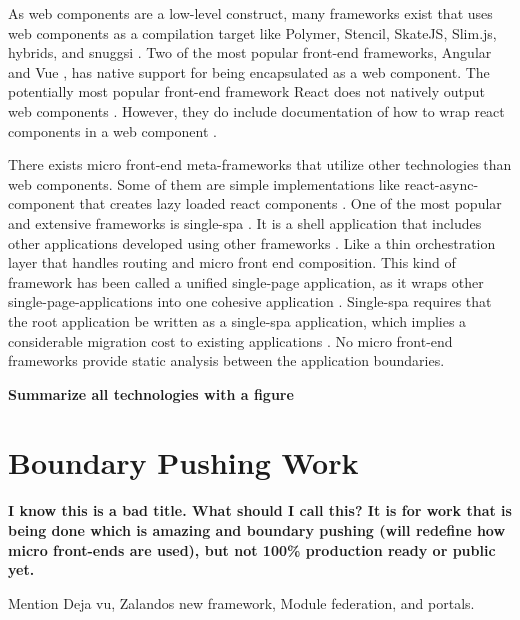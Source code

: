 As web components are a low-level construct, many frameworks exist that uses web components as a compilation target like Polymer, Stencil, SkateJS, Slim.js, hybrids, and snuggsi \cite{WebComponents.orgb}. Two of the most popular front-end frameworks, Angular \cite{Googlec} and Vue \cite{Vuejs}, has native support for being encapsulated as a web component. The potentially most popular front-end framework React does not natively output web components \cite{Dodson}. However, they do include documentation of how to wrap react components in a web component \cite{FacebookInc.}.

There exists micro front-end meta-frameworks that utilize other technologies than web components. Some of them are simple implementations like react-async-component that creates lazy loaded react components \cite{Matheson}. One of the most popular and extensive frameworks is single-spa \cite{Single-spa}. It is a shell application that includes other applications developed using other frameworks \cite{Single-spa}. Like a thin orchestration layer that handles routing and micro front end composition. This kind of framework has been called a unified single-page application, as it wraps other single-page-applications into one cohesive application \cite{Geers2020}. Single-spa requires that the root application be written as a single-spa application, which implies a considerable migration cost to existing applications \cite{Single-spa}. No micro front-end frameworks provide static analysis between the application boundaries.

\textbf{Summarize all technologies with a figure}

\section{Boundary Pushing Work}

\textbf{I know this is a bad title. What should I call this? It is for work that is being done which is amazing and boundary pushing (will redefine how micro front-ends are used), but not 100\% production ready or public yet.}

Mention Deja vu, Zalandos new framework, Module federation, and portals.